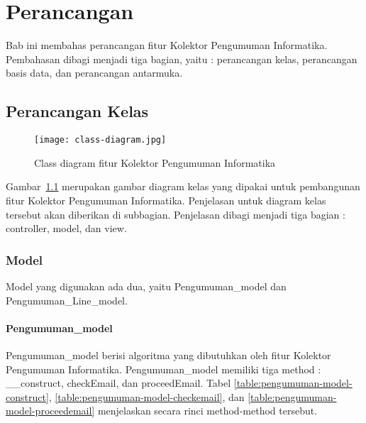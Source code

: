\chapter{Perancangan}
\label{chap:perancangan}

Bab ini membahas perancangan fitur Kolektor Pengumuman Informatika. Pembahasan dibagi menjadi tiga bagian, yaitu : perancangan kelas, perancangan basis data, dan perancangan antarmuka.
 
\section{Perancangan Kelas}
\begin{figure}[H]
	\centering  
	\texttt{[image: class-diagram.jpg]}  
	\caption[Class diagram fitur Kolektor Pengumuman Informatika]{Class diagram fitur Kolektor Pengumuman Informatika} 
	\label{fig:class-diagram} 
\end{figure}
Gambar~\ref{fig:class-diagram} merupakan gambar diagram kelas yang dipakai untuk pembangunan fitur Kolektor Pengumuman Informatika. Penjelasan untuk diagram kelas tersebut akan diberikan di subbagian. Penjelasan dibagi menjadi tiga bagian : controller, model, dan view.

\subsection{Model}
Model yang digunakan ada dua, yaitu Pengumuman\_model dan Pengumuman\_Line\_model.
\subsubsection{Pengumuman\_model}
Pengumuman\_model berisi algoritma yang dibutuhkan oleh fitur Kolektor Pengumuman Informatika. Pengumuman\_model memiliki tiga method : \_\_construct, checkEmail, dan proceedEmail. Tabel \ref{table:pengumuman-model-construct}, \ref{table:pengumuman-model-checkemail}, dan \ref{table:pengumuman-model-proceedemail} menjelaskan secara rinci method-method tersebut.

